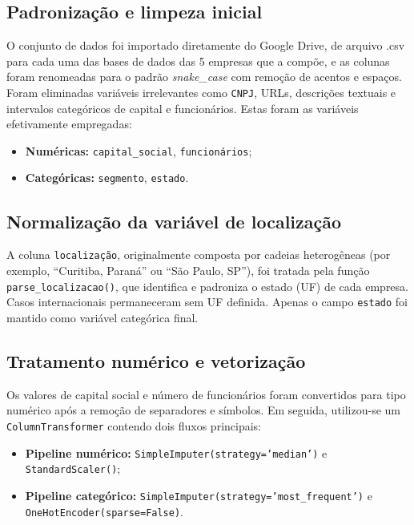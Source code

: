 \subsection{Padronização e limpeza inicial}

O conjunto de dados foi importado diretamente do Google Drive, de arquivo .csv para cada uma das bases de dados das 5 empresas que a compõe, e as colunas foram renomeadas para o padrão \textit{snake\_case} com remoção de acentos e espaços. Foram eliminadas variáveis irrelevantes como \texttt{CNPJ}, URLs, descrições textuais e intervalos categóricos de capital e funcionários. Estas foram as variáveis efetivamente empregadas:

\begin{itemize}
    \item \textbf{Numéricas:} \texttt{capital\_social}, \texttt{funcionários};
    \item \textbf{Categóricas:} \texttt{segmento}, \texttt{estado}.
\end{itemize}

\subsection{Normalização da variável de localização}

A coluna \texttt{localização}, originalmente composta por cadeias heterogêneas (por exemplo, ``Curitiba, Paraná'' ou ``São Paulo, SP''), foi tratada pela função \texttt{parse\_localizacao()}, que identifica e padroniza o estado (UF) de cada empresa. Casos internacionais permaneceram sem UF definida. Apenas o campo \texttt{estado} foi mantido como variável categórica final.

\subsection{Tratamento numérico e vetorização}

Os valores de capital social e número de funcionários foram convertidos para tipo numérico após a remoção de separadores e símbolos. Em seguida, utilizou-se um \texttt{ColumnTransformer} contendo dois fluxos principais:
\begin{itemize}
    \item \textbf{Pipeline numérico:} \texttt{SimpleImputer(strategy='median')} e \texttt{StandardScaler()};
    \item \textbf{Pipeline categórico:} \texttt{SimpleImputer(strategy='most\_frequent')} e \texttt{OneHotEncoder(sparse=False)}.
\end{itemize}

